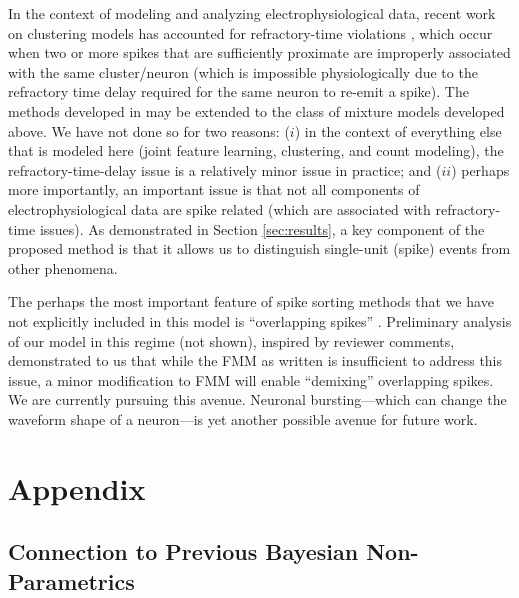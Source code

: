 \documentclass[journal]{IEEEtran}
\begin{document}
In the context of modeling and analyzing electrophysiological data, recent work on clustering models has accounted for refractory-time
violations \cite{Wood2009,Calabrese2010,Bo2011}, which occur when two or more spikes that
are sufficiently proximate are improperly associated with the same
cluster/neuron (which is impossible physiologically due to the refractory time delay
required for the same neuron to re-emit a spike). The methods developed in \cite{Wood2009,Bo2011} may be extended to the class of mixture models developed above. We have not done so for two reasons: ($i$) in the context of everything else that is modeled here (joint feature learning, clustering, and count modeling), the refractory-time-delay issue is a relatively minor issue in practice; and ($ii$) perhaps more importantly, an important issue is that not all components of electrophysiological data are spike related (which are associated with refractory-time issues). As demonstrated in Section \ref{sec:results}, a key component of the proposed method is that it allows us to distinguish single-unit (spike) events from other phenomena.


The perhaps the most important feature of spike sorting methods that we have not explicitly included in this model is ``overlapping spikes'' \cite{Bar-Gad2001, Zhang2004, Wang2006, Vargas-Irwin2007, Herbst2008a, Adamos2010, Franke2010b}. Preliminary analysis of our model in this regime (not shown), inspired by reviewer comments, demonstrated to us that while the FMM as written is insufficient to address this issue, a minor modification to FMM will enable ``demixing'' overlapping spikes.  We are currently pursuing this avenue.  Neuronal bursting---which can change the waveform shape of a neuron---is yet another possible avenue for future work.  


\section*{Appendix} \label{sec:appendix}

\setcounter{subsection}{0}
\subsection{Connection to Previous Bayesian Non-Parametrics} %
\label{sub:connection_to_previous_bayesian_non_parametrics}

\end{document}
